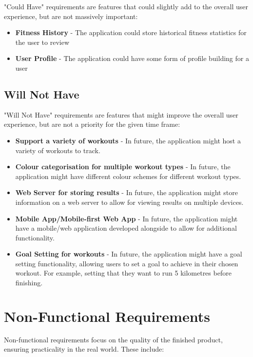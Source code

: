 \documentclass{l4proj}
\begin{document}
"Could Have" requirements are features that could slightly add to the overall user experience, but are not massively important:

\begin{itemize}
    \item \textbf{Fitness History} - The application could store historical fitness statistics for the user to review
    \item \textbf{User Profile} - The application could have some form of profile building for a user
\end{itemize}

\subsection{Will Not Have}

"Will Not Have" requirements are features that might improve the overall user experience, but are not a priority for the given time frame:

\begin{itemize}
    \item \textbf{Support a variety of workouts} - In future, the application might host a variety of workouts to track.
    \item \textbf{Colour categorisation for multiple workout types} - In future, the application might have different colour schemes for different workout types.
    \item \textbf{Web Server for storing results} - In future, the application might store information on a web server to allow for viewing results on multiple devices.
    \item \textbf{Mobile App/Mobile-first Web App} - In future, the application might have a mobile/web application developed alongside to allow for additional functionality.
    \item \textbf{Goal Setting for workouts} - In future, the application might have a goal setting functionality, allowing users to set a goal to achieve in their chosen workout. For example, setting that they want to run 5 kilometres before finishing.
\end{itemize}

\section{Non-Functional Requirements}

Non-functional requirements focus on the quality of the finished product, ensuring practicality in the real world. These include:
\end{document}
